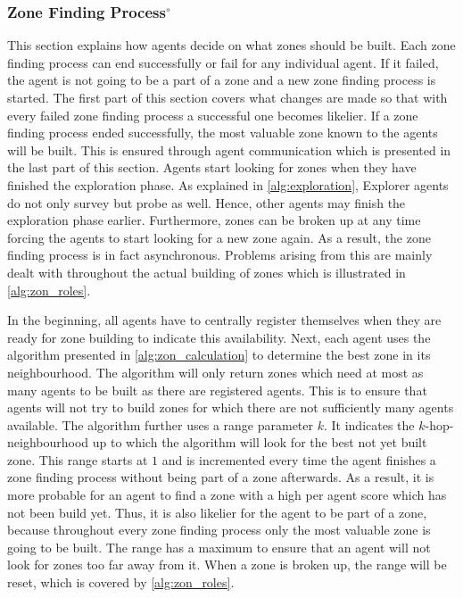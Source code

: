 \subsubsection[Zone Finding Process]{Zone Finding Process$^\circ$}\label{alg:zon_finding}
This section explains how agents decide on what zones should be built.
Each zone finding process can end successfully or fail for any individual agent.
If it failed, the agent is not going to be a part of a zone and a new zone finding process is started.
The first part of this section covers what changes are made so that with every failed zone finding process a successful one becomes likelier.
If a zone finding process ended successfully, the most valuable zone known to the agents will be built.
This is ensured through agent communication which is presented in the last part of this section.
Agents start looking for zones when they have finished the exploration phase.
As explained in \autoref{alg:exploration}, Explorer agents do not only survey but probe as well.
Hence, other agents may finish the exploration phase earlier.
Furthermore, zones can be broken up at any time forcing the agents to start looking for a new zone again.
As a result, the zone finding process is in fact asynchronous.
Problems arising from this are mainly dealt with throughout the actual building of zones which is illustrated in \autoref{alg:zon_roles}.

In the beginning, all agents have to centrally register themselves when they are ready for zone building to indicate this availability.
Next, each agent uses the algorithm presented in \autoref{alg:zon_calculation} to determine the best zone in its neighbourhood.
The algorithm will only return zones which need at most as many agents to be built as there are registered agents.
This is to ensure that agents will not try to build zones for which there are not sufficiently many agents available.
The algorithm further uses a range parameter $k$.
It indicates the $k$-hop-neighbourhood up to which the algorithm will look for the best not yet built zone.
This range starts at $1$ and is incremented every time the agent finishes a zone finding process without being part of a zone afterwards.
As a result, it is more probable for an agent to find a zone with a high per agent score which has not been build yet.
Thus, it is also likelier for the agent to be part of a zone, because throughout every zone finding process only the most valuable zone is going to be built.
The range has a maximum to ensure that an agent will not look for zones too far away from it.
When a zone is broken up, the range will be reset, which is covered by \autoref{alg:zon_roles}.

